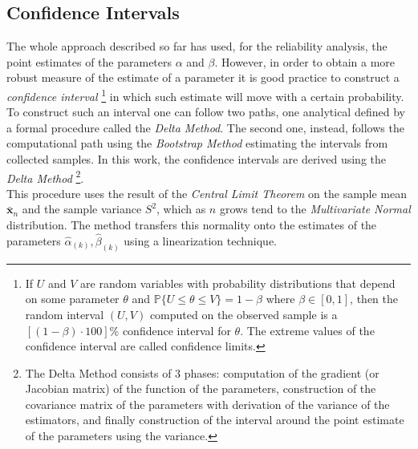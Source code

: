 \documentclass[10pt]{article} %
\begin{document}
\subsection{Confidence Intervals}
The whole approach described so far has used, for the reliability analysis, the point estimates of the parameters $\alpha$ and $\beta$. However, in order to obtain a more robust measure of the estimate of a parameter it is good practice to construct a \textit{confidence interval} \footnote{If $U$ and $V$ are random variables with probability distributions that depend on some parameter $\theta$ and $\mathbb{P}\{U\le \theta \le V\} = 1-\beta$ where $\beta \in [0, 1]$, then the random interval $(U, V)$ computed on the observed sample is a $[(1-\beta)\cdot100]\%$ confidence interval for $\theta$. The extreme values of the confidence interval are called confidence limits.} in which such estimate will move with a certain probability. To construct such an interval one can follow two paths, one analytical defined by a formal procedure called the \textit{Delta Method}. The second one, instead, follows the computational path using the \textit{Bootstrap Method} estimating the intervals from collected samples. In this work, the confidence intervals are derived using the \textit{Delta Method} \footnote{The Delta Method consists of 3 phases: computation of the gradient (or Jacobian matrix) of the function of the parameters, construction of the covariance matrix of the parameters with derivation of the variance of the estimators, and finally construction of the interval around the point estimate of the parameters using the variance.}.\\
This procedure uses the result of the \textit{Central Limit Theorem} on the sample mean $\bar{\mathbf{x}}_{n}$ and the sample variance $S^{2}$, which as $n$ grows tend to the \textit{Multivariate Normal} distribution. The method transfers this normality onto the estimates of the parameters $\hat{\alpha}_{(k)},\hat{\beta}_{(k)}$ using a linearization technique.
\end{document}
